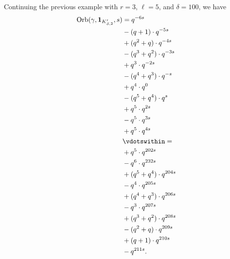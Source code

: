 \begin{example}
  Continuing the previous example with
  $r=3$, $\ell=5$, and $\delta=100$, we have
  \begin{align*}
  \Orb(\gamma, \mathbf{1}_{K'_{S, 2}}, s)
  &= q^{-6s} \\
  &- (q+1) \cdot q^{-5s} \\
  &+ (q^2+q) \cdot q^{-4s} \\
  &- (q^3+q^2) \cdot q^{-3s} \\
  &+ q^3 \cdot q^{-2s} \\
  &- (q^4+q^3) \cdot q^{-s} \\
  &+ q^4 \cdot q^{0} \\
  &- (q^5+q^4) \cdot q^{s} \\
  &+ q^5 \cdot q^{2s} \\
  &- q^5 \cdot q^{3s} \\
  &+ q^5 \cdot q^{4s} \\
  &\vdotswithin= \\
  &+ q^5 \cdot q^{202s} \\
  &- q^6 \cdot q^{232s} \\
  &+ (q^5+q^4) \cdot q^{204s} \\
  &- q^4 \cdot q^{205s} \\
  &+ (q^4+q^3) \cdot q^{206s} \\
  &- q^3 \cdot q^{207s} \\
  &+ (q^3+q^2) \cdot q^{208s} \\
  &- (q^2+q) \cdot q^{209s} \\
  &+ (q+1) \cdot q^{210s} \\
  &- q^{211s}.
  \end{align*}
\end{example}

